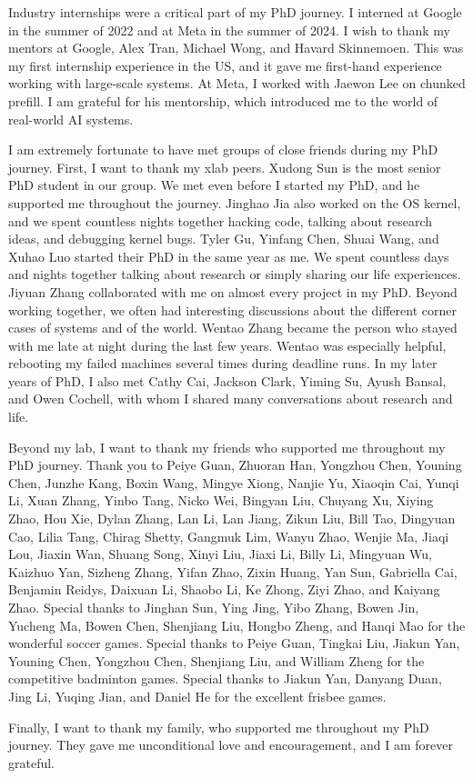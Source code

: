 \documentclass{uofithesis}
\begin{document}
{Industry internships were a critical part of my PhD journey. I interned at Google in the summer of 2022 and at Meta in the summer of 2024.
I wish to thank my mentors at Google, Alex Tran, Michael Wong, and Havard Skinnemoen.
This was my first internship experience in the US, and it gave me first-hand experience working with large-scale systems.
At Meta, I worked with Jaewon Lee on chunked prefill.
I am grateful for his mentorship, which introduced me to the world of real-world AI systems.

I am extremely fortunate to have met groups of close friends during my PhD journey.
First, I want to thank my xlab peers.
Xudong Sun is the most senior PhD student in our group.
We met even before I started my PhD, and he supported me throughout the journey.
Jinghao Jia also worked on the OS kernel, and we spent countless nights together hacking code,
talking about research ideas, and debugging kernel bugs.
Tyler Gu, Yinfang Chen, Shuai Wang, and Xuhao Luo started their PhD in the same year as me.
We spent countless days and nights together talking about research or simply sharing our life experiences.
Jiyuan Zhang collaborated with me on almost every project in my PhD. Beyond working together,
we often had interesting discussions about the different corner cases of systems and of the world.
Wentao Zhang became the person who stayed with me late at night during the last few years.
Wentao was especially helpful, rebooting my failed machines several times during deadline runs.
In my later years of PhD, I also met Cathy Cai, Jackson Clark, Yiming Su, Ayush Bansal, and Owen Cochell,
with whom I shared many conversations about research and life.

Beyond my lab, I want to thank my friends who supported me throughout my PhD journey.
Thank you to Peiye Guan, Zhuoran Han, Yongzhou Chen, Youning Chen, Junzhe Kang, Boxin Wang, Mingye Xiong, Nanjie Yu, Xiaoqin Cai, Yunqi Li, Xuan Zhang, Yinbo Tang, Nicko Wei, Bingyan Liu, Chuyang Xu, Xiying Zhao, Hou Xie,
Dylan Zhang, Lan Li, Lan Jiang, Zikun Liu, Bill Tao, Dingyuan Cao, Lilia Tang, Chirag Shetty, Gangmuk Lim, Wanyu Zhao, Wenjie Ma, Jiaqi Lou, Jiaxin Wan, Shuang Song, Xinyi Liu, Jiaxi Li,
Billy Li, Mingyuan Wu, Kaizhuo Yan, Sizheng Zhang, Yifan Zhao, Zixin Huang,
Yan Sun, Gabriella Cai, Benjamin Reidys, Daixuan Li, Shaobo Li, Ke Zhong, Ziyi Zhao, and Kaiyang Zhao.
Special thanks to Jinghan Sun, Ying Jing, Yibo Zhang, Bowen Jin, Yucheng Ma, Bowen Chen, Shenjiang Liu, Hongbo Zheng, and Hanqi Mao for the wonderful soccer games.
Special thanks to Peiye Guan, Tingkai Liu, Jiakun Yan, Youning Chen, Yongzhou Chen, Shenjiang Liu, and William Zheng for the competitive badminton games.
Special thanks to Jiakun Yan, Danyang Duan, Jing Li, Yuqing Jian, and Daniel He for the excellent frisbee games.

Finally, I want to thank my family, who supported me throughout my PhD journey.
They gave me unconditional love and encouragement, and I am forever grateful.
}
\end{document}
